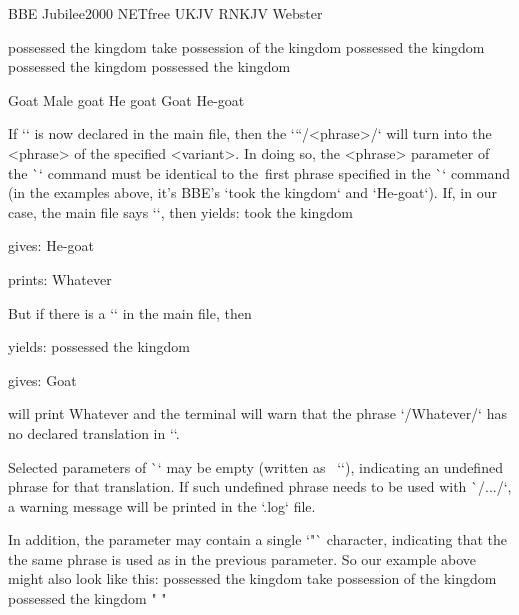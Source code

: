 \begtt
{} {BBE} {Jubilee2000} {NETfree} {UKJV} {RNKJV} {Webster} 

      {possessed the kingdom} %
      {take possession of the kingdom} %
      {possessed the kingdom} %
      {possessed the kingdom} %
      {possessed the kingdom} %
      
      {Goat} %
      {Male goat} %
      {He goat} %
      {Goat} %
      {He-goat} %

\endtt

If `\def\tmark {<variant>}` is now declared in the main file,
then the `\x``/<phrase>/` will turn into the <phrase> of the specified <variant>.
In doing so, the <phrase> parameter of the \`\x` command must be identical 
to the~first phrase specified in the \`\vdef` command (in the examples above, 
it's BBE's `took the kingdom` and `He-goat`). 
If, in our case, the main file says `\def\tmark{BBE}`, then
\medskip
{} yields: took the kingdom 

 gives: He-goat

 prints: Whatever

\medskip

But if there is a `\def\tmark{Jubilee2000}` in the main file, then

\medskip
{} yields: possessed the kingdom 

 gives: Goat

  will print Whatever and the terminal will warn
                                  that the phrase `\x/Whatever/` has no declared translation in `\vdef`.
\medskip



Selected parameters of \`\vdef` may be empty (written as ~`{}`),
indicating an undefined phrase for that translation.
If such undefined phrase needs to be used with \`\x/.../`, a warning message 
will be printed in the `.log` file.

In addition, the parameter may contain a single `"` character, indicating that the
the same phrase is used as in the previous parameter. So our
example above might also look like this:
\begtt
{} %
      {possessed the kingdom} %
      {take possession of the kingdom} %
      {possessed the kingdom} %
      {"} %
      {"} %
\endtt

